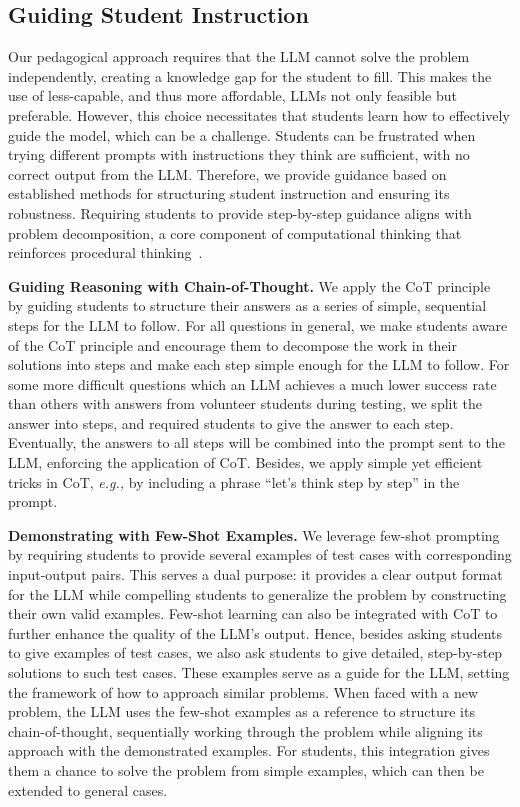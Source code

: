 \documentclass{article} %
\begin{document}
\subsection{Guiding Student Instruction} 
\label{sec:prompt_engineering}
Our pedagogical approach requires that the LLM cannot solve the problem independently, creating a knowledge gap for the student to fill. This makes the use of less-capable, and thus more affordable, LLMs not only feasible but preferable. However, this choice necessitates that students learn how to effectively guide the model, which can be a challenge. Students can be frustrated when trying different prompts with instructions they think are sufficient, with no correct output from the LLM. Therefore, we provide guidance based on established methods for structuring student instruction and ensuring its robustness. Requiring students to provide step-by-step guidance aligns with problem decomposition, a core component of computational thinking that reinforces procedural thinking~\citep{Brennan2012CTFrameworks, Lye2014CTReview}.


\textbf{Guiding Reasoning with Chain-of-Thought.} We apply the CoT principle~\citep{kojima2022large, wei2022chain} by guiding students to structure their answers as a series of simple, sequential steps for the LLM to follow.
For all questions in general, we make students aware of the CoT principle and
encourage them to decompose the work in their solutions into steps and make each
step simple enough for the LLM to follow. For some more difficult questions which
an LLM achieves a much lower success rate than others with answers from volunteer
students during testing, we split the answer into steps, and
required students to give the answer to each step. Eventually, the answers to all
steps will be combined into the prompt sent to the LLM, enforcing the
application of CoT.
Besides, we apply simple yet efficient tricks in CoT, {\em e.g.,} by including a phrase
``let's think step by step'' in the prompt.


\textbf{Demonstrating with Few-Shot Examples.} We leverage few-shot prompting~\citep{Brown2020LanguageMA} by requiring students to provide several examples of test cases with corresponding input-output pairs. This serves a dual purpose: it provides a clear output format for the LLM while compelling students to generalize the problem by constructing their own valid examples. 
Few-shot learning can also be integrated with CoT to further enhance the quality
of the LLM's output. Hence, besides asking students to give examples of test
cases, we also ask students to give detailed, step-by-step solutions to such
test cases. These examples serve as a guide for the LLM, setting the framework
of how to approach similar problems. When faced with a new problem, the LLM uses
the few-shot examples as a reference to structure its chain-of-thought,
sequentially working through the problem while aligning its approach with the
demonstrated examples. For students, this integration gives them a chance to
solve the problem from simple examples, which can then be extended to general
cases.
\end{document}
